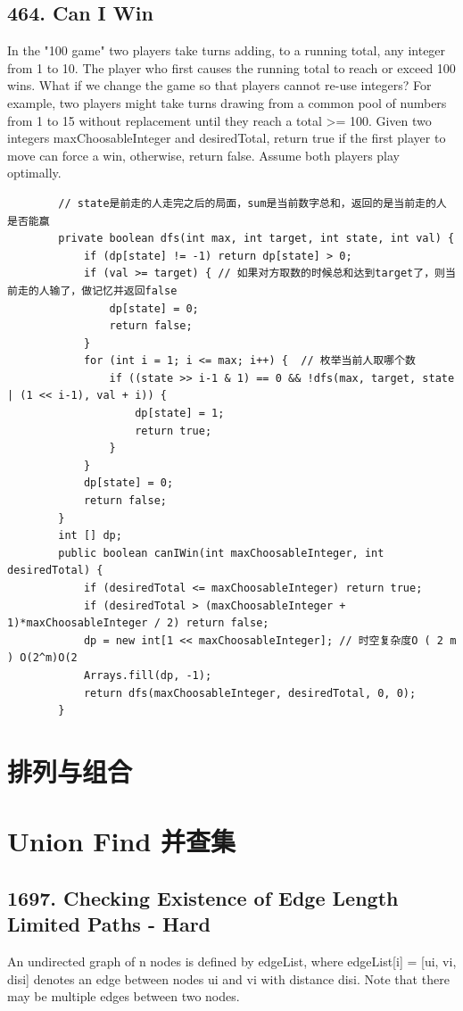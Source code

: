 \documentclass[9pt, b5paper]{article}
\begin{document}
\subsection{464. Can I Win}
\label{sec-9-1}
In the "100 game" two players take turns adding, to a running total, any integer from 1 to 10. The player who first causes the running total to reach or exceed 100 wins.
What if we change the game so that players cannot re-use integers?
For example, two players might take turns drawing from a common pool of numbers from 1 to 15 without replacement until they reach a total >= 100.
Given two integers maxChoosableInteger and desiredTotal, return true if the first player to move can force a win, otherwise, return false. Assume both players play optimally.
\begin{verbatim}
        // state是前走的人走完之后的局面，sum是当前数字总和，返回的是当前走的人是否能赢
        private boolean dfs(int max, int target, int state, int val) {
            if (dp[state] != -1) return dp[state] > 0;
            if (val >= target) { // 如果对方取数的时候总和达到target了，则当前走的人输了，做记忆并返回false
                dp[state] = 0;
                return false;
            }
            for (int i = 1; i <= max; i++) {  // 枚举当前人取哪个数
                if ((state >> i-1 & 1) == 0 && !dfs(max, target, state | (1 << i-1), val + i)) {
                    dp[state] = 1;
                    return true;
                }
            }
            dp[state] = 0;
            return false;
        }
        int [] dp;
        public boolean canIWin(int maxChoosableInteger, int desiredTotal) {
            if (desiredTotal <= maxChoosableInteger) return true;
            if (desiredTotal > (maxChoosableInteger + 1)*maxChoosableInteger / 2) return false;
            dp = new int[1 << maxChoosableInteger]; // 时空复杂度O ( 2 m ) O(2^m)O(2 
            Arrays.fill(dp, -1);
            return dfs(maxChoosableInteger, desiredTotal, 0, 0);
        }
\end{verbatim}


\section{排列与组合}
\label{sec-10}


\section{Union Find 并查集}
\label{sec-11}
\subsection{1697. Checking Existence of Edge Length Limited Paths - Hard}
\label{sec-11-1}
An undirected graph of n nodes is defined by edgeList, where edgeList[i] = [ui, vi, disi] denotes an edge between nodes ui and vi with distance disi. Note that there may be multiple edges between two nodes.
\end{document}
